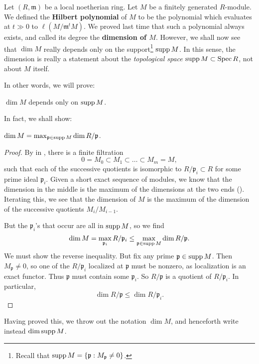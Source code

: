 Let $(R, \mathfrak{m})$ be a local noetherian ring. Let $M$ be a finitely generated
$R$-module. 	We defined the \textbf{Hilbert polynomial} of $M$ to be the
polynomial which evaluates at $t \gg 0$ to $\ell(M/\mathfrak{m}^tM)$. We proved
last time that such a polynomial always exists, and called its degree the
\textbf{dimension of $M$}. However, 
we shall now see that $\dim M$ really depends only on the support\footnote{
Recall that $\operatorname{supp} M = \left\{\mathfrak{p}: M_{\mathfrak{p}}\neq 0\right\}$.} $\operatorname{supp} M$.
In this sense, the dimension is really a statement about the \emph{topological
space} $\operatorname{supp} M \subset \operatorname{Spec} R$, not about $M$ itself. 


In other words, we will prove:
\begin{proposition} 
$\dim M$ depends only on $\operatorname{supp} M$.
\end{proposition} 

In fact, we shall show:

\begin{proposition} 
$\dim M = \max_{\mathfrak{p} \in \operatorname{supp} M} \dim R/\mathfrak{p}$.
\end{proposition} 
\begin{proof} 
By  in , there is a finite filtration 
\[ 0 = M_0 \subset M_1 \subset \dots \subset M_m = M,  \]
such that each of the successive quotients is isomorphic to $R/\mathfrak{p}_i
\subset R$
for some prime ideal $\mathfrak{p}_i$. Given a short exact sequence
of modules, we know that the dimension in the middle is the maximum of the dimensions at the
two ends (). Iterating this, we see that the
dimension of $M$ is the maximum of the
dimension of the successive quotients $M_i/M_{i-1}$.

But the $\mathfrak{p}_i$'s that occur
are all in $\operatorname{supp} M$, so we find 
\[ \dim M = \max_{\mathfrak{p}_i} R/\mathfrak{p}_i \leq \max_{\mathfrak{p} \in \operatorname{supp} M} \dim R/\mathfrak{p}.  \]
We must show the reverse inequality. But fix any prime $\mathfrak{p} \in \operatorname{supp}
M$. Then $M_{\mathfrak{p}} \neq 0$, so one of the $R/\mathfrak{p}_i$ localized
at  $\mathfrak{p}$ must be nonzero, as localization is an exact functor. Thus
$\mathfrak{p}$ must contain some $\mathfrak{p}_i$. So $R/\mathfrak{p}$ is a
quotient of $R/\mathfrak{p}_i$. In particular,
\[ \dim R/\mathfrak{p} \leq \dim R/\mathfrak{p}_i.  \]
\end{proof} 

Having proved this, we throw out the notation $\dim M$, and henceforth write
instead $\dim \operatorname{supp} M$.



